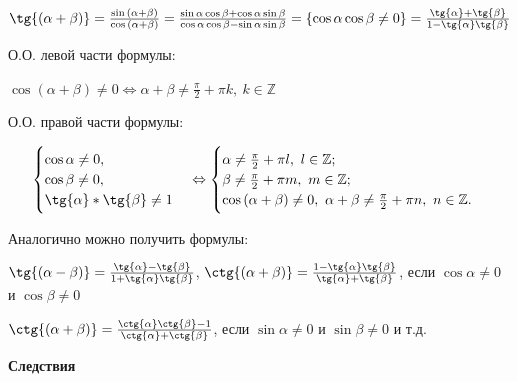 \documentclass{article}
\begin{document}
        \(\tg{(\alpha + \beta)} = \frac{\sin{(\alpha + \beta)}}{\cos{(\alpha + \beta)}} = \frac{\sin{\alpha}\cos{\beta} + \cos{\alpha}\sin{\beta}}{\cos{\alpha}\cos{\beta} - \sin{\alpha}\sin{\beta}} = \{\cos{\alpha}\cos{\beta} \not = 0\} = \frac{\tg{\alpha} + \tg{\beta}}{1 - \tg{\alpha}\tg{\beta}}\)
        
        О.О. левой части формулы:
        
        \(\cos{(\alpha + \beta)} \not = 0 \Leftrightarrow \alpha + \beta \not = \frac{\pi}{2} + \pi k,\ k \in \mathbb{Z}\)
        
        О.О. правой части формулы:
        
        \begin{equation}
            \begin{cases}
                \cos{\alpha} \not = 0,\\
                \cos{\beta} \not = 0,\\
                \tg{\alpha}*\tg{\beta} \not = 1
            \end{cases}\Leftrightarrow
            \begin{cases}
                \alpha \not = \frac{\pi}{2} + \pi l,\ l \in \mathbb{Z};\\
                \beta \not = \frac{\pi}{2} + \pi m,\ m \in \mathbb{Z};\\
                \cos{(\alpha + \beta)} \not = 0,\ \alpha + \beta \not = \frac{\pi}{2} + \pi n,\ n \in \mathbb{Z}.
            \end{cases}
        \end{equation}
        
        Аналогично можно получить формулы:
        
        \(\tg{(\alpha - \beta)} = \frac{\tg{\alpha} - \tg{\beta}}{1 + \tg{\alpha}\tg{\beta}}\), \(\ctg{(\alpha + \beta)} = \frac{1 - \tg{\alpha}\tg{\beta}}{\tg{\alpha} + \tg{\beta}}\), если \(\cos{\alpha} \not = 0\) и \(\cos{\beta} \not = 0\)
        
        \(\ctg{(\alpha + \beta)} = \frac{\ctg{\alpha}\ctg{\beta} - 1}{\ctg{\alpha} + \ctg{\beta}}\), если \(\sin{\alpha} \not = 0\) и \(\sin{\beta} \not = 0\) и т.д.
        
        \textbf{Следствия}
        
\end{document}
